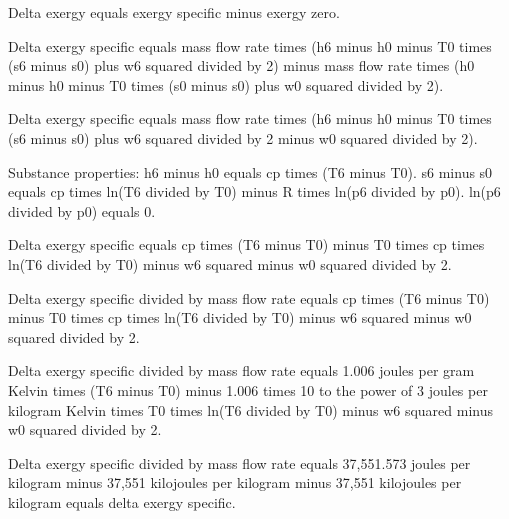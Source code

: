 Delta exergy equals exergy specific minus exergy zero.  

Delta exergy specific equals mass flow rate times (h6 minus h0 minus T0 times (s6 minus s0) plus w6 squared divided by 2) minus mass flow rate times (h0 minus h0 minus T0 times (s0 minus s0) plus w0 squared divided by 2).  

Delta exergy specific equals mass flow rate times (h6 minus h0 minus T0 times (s6 minus s0) plus w6 squared divided by 2 minus w0 squared divided by 2).  

Substance properties:  
h6 minus h0 equals cp times (T6 minus T0).  
s6 minus s0 equals cp times ln(T6 divided by T0) minus R times ln(p6 divided by p0).  
ln(p6 divided by p0) equals 0.  

Delta exergy specific equals cp times (T6 minus T0) minus T0 times cp times ln(T6 divided by T0) minus w6 squared minus w0 squared divided by 2.  

Delta exergy specific divided by mass flow rate equals cp times (T6 minus T0) minus T0 times cp times ln(T6 divided by T0) minus w6 squared minus w0 squared divided by 2.  

Delta exergy specific divided by mass flow rate equals 1.006 joules per gram Kelvin times (T6 minus T0) minus 1.006 times 10 to the power of 3 joules per kilogram Kelvin times T0 times ln(T6 divided by T0) minus w6 squared minus w0 squared divided by 2.  

Delta exergy specific divided by mass flow rate equals 37,551.573 joules per kilogram minus 37,551 kilojoules per kilogram minus 37,551 kilojoules per kilogram equals delta exergy specific.